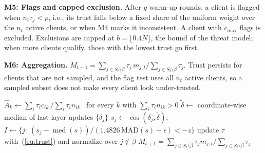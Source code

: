 \documentclass[conference]{IEEEtran}
\begin{document}
\textbf{M5: Flags and capped exclusion.} After $g$ warm-up rounds, a client is flagged when $n_t\tau_j<\rho$, i.e., its trust falls below a fixed share of the uniform weight over the $n_t$ active clients, or when M4 marks it inconsistent. A client with $c_{\max}$ flags is excluded. Exclusions are capped at $b=\lfloor0.4N\rfloor$, the bound of the threat model; when more clients qualify, those with the lowest trust go first.

\textbf{M6: Aggregation.} $M_{t+1}=\sum_{j\in S_t\setminus\beta}\tau_j\,m_{j,t}\big/\sum_{j\in S_t\setminus\beta}\tau_j$. Trust persists for clients that are not sampled, and the flag test uses all $n_t$ active clients, so a sampled subset does not make every client look under-trusted.

\setlength{\textfloatsep}{8pt}
\begin{algorithm}[t]
\caption{AntiFLipper: server side of round $t$}
\label{alg:af}
\small
{}
$\hat A_k\leftarrow\sum_i\tau_ic_{ik}\,/\sum_i\tau_in_{ik}$ \ for every $k$ with $\sum_i\tau_in_{ik}>0$\;
$\tilde\delta\leftarrow$ coordinate-wise median of last-layer updates $\{\delta_j\}$\;
$s_j\leftarrow\cos(\delta_j,\tilde\delta)$; \ $I\leftarrow\{j:\ (s_j-\operatorname{med}(s))/(1.4826\,\mathrm{MAD}(s)+\epsilon)<-z\}$\;
update $\tau$ with~(\ref{eq:trust}) and normalize over $j\notin\beta$\;
\Return $M_{t+1}=\sum_{j\in S_t\setminus\beta}\tau_j m_{j,t}/\sum_{j\in S_t\setminus\beta}\tau_j$
\end{algorithm}

\end{document}
